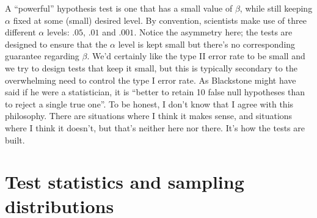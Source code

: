\documentclass[
  a4paper,
]{book}
\begin{document}
\begin{table}

\caption{\label{tbl-tab9-3}Null hypothesis statistical testing (NHST) --
additional detail}

\centering
{}

\end{table}%

A ``powerful'' hypothesis test is one that has a small value of
\(\beta\), while still keeping \(\alpha\) fixed at some (small) desired
level. By convention, scientists make use of three different \(\alpha\)
levels: \(.05\), \(.01\) and \(.001\). Notice the asymmetry here; the
tests are designed to ensure that the \(\alpha\) level is kept small but
there's no corresponding guarantee regarding \(\beta\). We'd certainly
like the type II error rate to be small and we try to design tests that
keep it small, but this is typically secondary to the overwhelming need
to control the type I error rate. As Blackstone might have said if he
were a statistician, it is ``better to retain 10 false null hypotheses
than to reject a single true one''. To be honest, I don't know that I
agree with this philosophy. There are situations where I think it makes
sense, and situations where I think it doesn't, but that's neither here
nor there. It's how the tests are built.

\section{Test statistics and sampling
distributions}\label{test-statistics-and-sampling-distributions}
\end{document}
